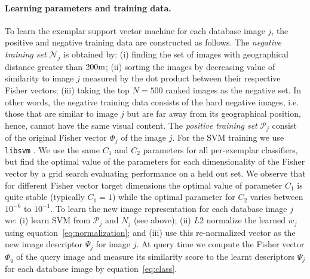 \documentclass[table]{article} %
\begin{document}
\paragraph{Learning parameters and training data.}
			To learn the exemplar support vector machine for each database image $j$, the positive and negative training data are constructed as follows. 
			The \emph{negative training set} $\mathcal N_j$ is obtained by: (i) finding the set of images with geographical distance greater than $200{\rm m}$; (ii)  sorting the images by decreasing value of similarity to image $j$ measured by the dot product between their respective Fisher vectors; (iii) taking the top $N=500$ ranked images as the negative set. 
			In other words, the negative training data consists of the hard negative images, i.e. those that are similar to image $j$ but are far away from its geographical position, hence, cannot have the same visual content. The \emph{positive training set} $\mathcal P_j$
			 consist of the original Fisher vector $\Phi_j$ of the image $j$.
			For the SVM training we use {\tt libsvm} \cite{libsvm}. %
			 We use the same $C_1$ and $C_2$ parameters for all per-exemplar classifiers, but find the optimal value of the parameters for each dimensionality of the Fisher vector by a grid search evaluating performance on a held out set.
			 We observe that for different Fisher vector target dimensions the optimal value of parameter $C_1$ is quite stable (typically $C_1=1$) while the optimal parameter for $C_2$ varies between $10^{-6}$ to $10^{-1}$.
			To learn the new image representation for each database image $j$ we: (i) learn SVM from $\mathcal P_j$ and $N_j$ (see above); (ii) $L2$ normalize the learned $w_j$ using equation~\eqref{eq:normalization}; and (iii) use this re-normalized vector as the new image descriptor $\Psi_j$ for image $j$. At query time we compute the Fisher vector $\Phi_q$ of the query image and measure its similarity score to the learnt descriptors $\Psi_j$ for each database image by equation~\eqref{eq:class}.
		
\end{document}
